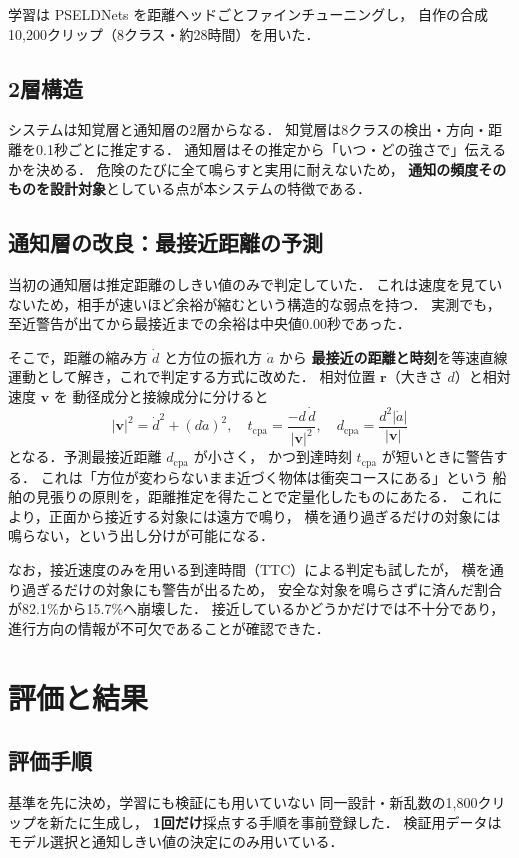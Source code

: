 \documentclass[twocolumn,a4paper,9pt]{jsarticle}
\begin{document}
学習は PSELDNets を距離ヘッドごとファインチューニングし，
自作の合成10,200クリップ（8クラス・約28時間）を用いた．

\subsection{2層構造}
システムは知覚層と通知層の2層からなる．
知覚層は8クラスの検出・方向・距離を0.1秒ごとに推定する．
通知層はその推定から「いつ・どの強さで」伝えるかを決める．
危険のたびに全て鳴らすと実用に耐えないため，
\textbf{通知の頻度そのものを設計対象}としている点が本システムの特徴である．

\subsection{通知層の改良：最接近距離の予測}
当初の通知層は推定距離のしきい値のみで判定していた．
これは速度を見ていないため，相手が速いほど余裕が縮むという構造的な弱点を持つ．
実測でも，至近警告が出てから最接近までの余裕は中央値0.00秒であった．

そこで，距離の縮み方 $\dot d$ と方位の振れ方 $\dot a$ から
\textbf{最接近の距離と時刻}を等速直線運動として解き，これで判定する方式に改めた．
相対位置 $\bm r$（大きさ $d$）と相対速度 $\bm v$ を
動径成分と接線成分に分けると
%
\begin{equation}
  |\bm v|^{2}=\dot d^{2}+(d\dot a)^{2},\quad
  t_{\mathrm{cpa}}=\frac{-d\,\dot d}{|\bm v|^{2}},\quad
  d_{\mathrm{cpa}}=\frac{d^{2}|\dot a|}{|\bm v|}
\end{equation}
%
となる．予測最接近距離 $d_{\mathrm{cpa}}$ が小さく，
かつ到達時刻 $t_{\mathrm{cpa}}$ が短いときに警告する．
これは「方位が変わらないまま近づく物体は衝突コースにある」という
船舶の見張りの原則を，距離推定を得たことで定量化したものにあたる．
これにより，正面から接近する対象には遠方で鳴り，
横を通り過ぎるだけの対象には鳴らない，という出し分けが可能になる．

なお，接近速度のみを用いる到達時間（TTC）による判定も試したが，
横を通り過ぎるだけの対象にも警告が出るため，
安全な対象を鳴らさずに済んだ割合が82.1\%から15.7\%へ崩壊した．
接近しているかどうかだけでは不十分であり，
進行方向の情報が不可欠であることが確認できた．

\section{評価と結果}

\subsection{評価手順}
基準を先に決め，学習にも検証にも用いていない
同一設計・新乱数の1,800クリップを新たに生成し，
\textbf{1回だけ}採点する手順を事前登録した．
検証用データはモデル選択と通知しきい値の決定にのみ用いている．
\end{document}
